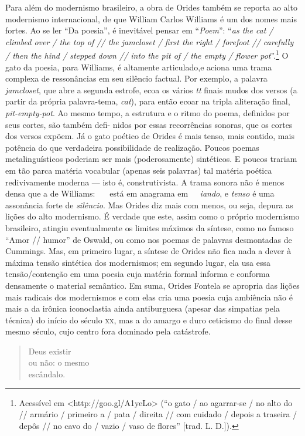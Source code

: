 Para além do modernismo brasileiro, a obra de Orides também se reporta
ao alto modernismo internacional, de que William Carlos Williams é um
dos nomes mais fortes. Ao se ler ``Da poesia'', é inevitável pensar em
``\emph{Poem}'': ``\emph{as the cat / climbed over / the top of // the
jamcloset / ﬁrst the right / forefoot // carefully / then the hind /
stepped down // into the pit of / the empty / ﬂower pot}''.\footnote{Acessível em \textless{}http://goo.gl/A1yeLo\textgreater{} (``o gato
/ ao agarrar-se / no alto do // armário / primeiro a / pata / direita // com cuidado / depois a traseira / depôs // no cavo do / vazio / vaso de ﬂores'' {[}trad. L. D.{]}).} O gato da poesia, para Williams, é altamente
articulado,e aciona uma trama complexa de ressonâncias em seu silêncio
factual. Por exemplo, a palavra \emph{jamcloset}, que abre a segunda
estrofe, ecoa os vários \emph{tt} ﬁnais mudos dos versos (a partir da própria palavra-tema, \emph{cat}), para então ecoar na tripla aliteração ﬁnal,
\emph{pit-empty-pot}. Ao mesmo tempo, a estrutura e o ritmo do poema,
deﬁnidos por seus cortes, são também deﬁ- nidos por essas recorrências
sonoras, que os cortes dos versos expõem. Já o gato poético de Orides é
mais tenso, mais contido, mais potência do que
verdadeira possibilidade de realização. Poucos poemas metalinguísticos
poderiam ser mais (poderosamente) sintéticos. E poucos trariam em tão
parca matéria vocabular (apenas seis palavras) tal matéria poética
redivivamente moderna --- isto é, construtivista. A trama sonora não é
menos densa que a de Williams:  está em anagrama em
\emph{iando}, e \emph{tenso} é uma assonância forte de
\emph{silêncio}. Mas Orides diz mais com menos, ou seja, depura as
lições do alto modernismo. É verdade que este, assim como o próprio
modernismo brasileiro, atingiu eventualmente os limites máximos da
síntese, como no famoso ``Amor // humor'' de Oswald, ou como nos poemas
de palavras desmontadas de Cummings. Mas, em primeiro lugar, a síntese
de Orides não ﬁca nada a dever à máxima tensão sintética dos
modernismos; em segundo lugar, ela usa essa tensão/contenção em uma
poesia cuja matéria formal informa e conforma densamente o material
semântico. Em suma, Orides Fontela se apropria das lições mais radicais
dos modernismos e com elas cria uma poesia cuja ambiência não é mais a
da irônica iconoclastia ainda antiburguesa (apesar das simpatias pela
técnica) do início do século \textsc{xx}, mas a do amargo e duro ceticismo do
ﬁnal desse mesmo século, cujo centro fora dominado pela catástrofe.

\begin{verse}
Deus existir\\
ou não: o mesmo\\
escândalo.
\end{verse}

